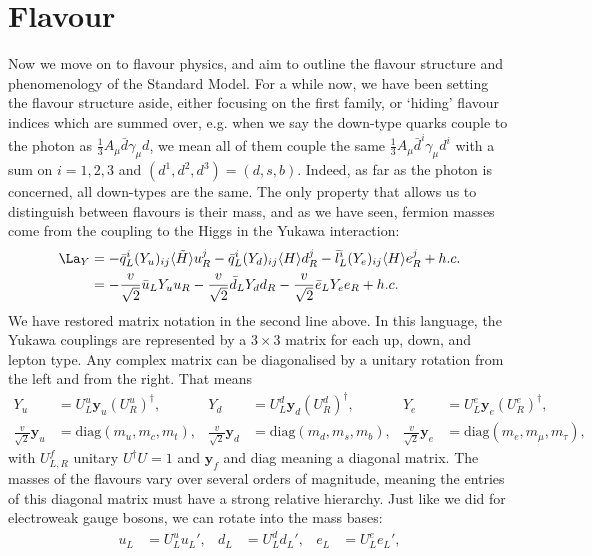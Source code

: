 \documentclass[relqm.tex]{subfiles}
\begin{document}
\section{Flavour}
Now we move on to flavour physics, and aim to outline the flavour structure and phenomenology of the Standard Model. 
For a while now, we have been setting the flavour structure aside, either focusing on the first family, or `hiding' flavour indices which are summed over, e.g. when we say the down-type quarks couple to the photon as $\frac{1}{3}A_\mu\bar{d}\gamma_\mu d$, we mean all of them couple the same $\frac{1}{3}A_\mu\bar{d}^i\gamma_\mu d^i$ with a sum on $i=1,2,3$ and $(d^1,d^2,d^3)=(d,s,b)$.
Indeed, as far as the photon is concerned, all down-types are the same. 
The only property that allows us to distinguish between flavours is their mass, and as we have seen, fermion masses come from the coupling to the Higgs in the Yukawa interaction:
\begin{align}
    \begin{split}
        \La_Y &= -\bar{q}_L^i(Y_u)_{ij}\langle\tilde{H}\rangle u_R^j - \bar{q}_L^i(Y_d)_{ij}\langle H\rangle d_R^j - \bar{l}_L^i(Y_e)_{ij}\langle H\rangle e_R^j + h.c. \\
              &= -\frac{v}{\sqrt{2}}\bar{u}_L Y_u u_R - \frac{v}{\sqrt{2}}\bar{d}_L Y_d d_R - \frac{v}{\sqrt{2}}\bar{e}_L Y_e e_R + h.c.
    \end{split}
\end{align}
We have restored matrix notation in the second line above. 
In this language, the Yukawa couplings are represented by a $3\times3$ matrix for each up, down, and lepton type. 
Any complex matrix can be diagonalised by a unitary rotation from the left and from the right. That means
\begin{align}
    Y_u &= U_L^u\mathbf{y}_u(U_R^u)^\dagger, & Y_d &= U_L^d\mathbf{y}_d(U_R^d)^\dagger, & Y_e &= U_L^e\mathbf{y}_e(U_R^e)^\dagger, \\
    \frac{v}{\sqrt{2}}\mathbf{y}_u &= \text{diag}(m_u,m_c,m_t), & \frac{v}{\sqrt{2}}\mathbf{y}_d &= \text{diag}(m_d,m_s,m_b), & \frac{v}{\sqrt{2}}\mathbf{y}_e &= \text{diag}(m_e,m_\mu,m_\tau),
\end{align}
with $U_{L,R}^f$ unitary $U^\dagger U=1$ and $\mathbf{y}_f$ and diag meaning a diagonal matrix. 
The masses of the flavours vary over several orders of magnitude, meaning the entries of this diagonal matrix must have a strong relative hierarchy. 
Just like we did for electroweak gauge bosons, we can rotate into the mass bases:
\begin{align}
    u_L &= U_L^uu_L', & d_L &= U_L^dd_L', & e_L &= U_L^ee_L',
\end{align}
\end{document}
